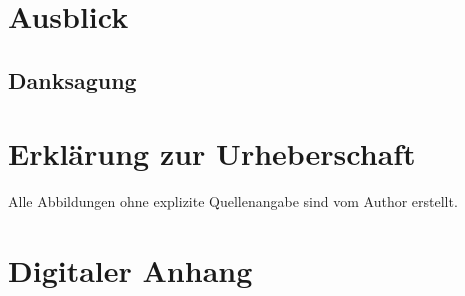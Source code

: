 \documentclass[a4paper,12pt]{article}
\begin{document}
\section{Ausblick}

\newpage
\subsection*{Danksagung}


\newpage
%


\newpage
\section*{Erklärung zur Urheberschaft}


\newpage


\newpage
Alle Abbildungen ohne explizite Quellenangabe sind vom Author erstellt.
\listoffigures


\newpage
\section*{Digitaler Anhang}


%

%
\end{document}
